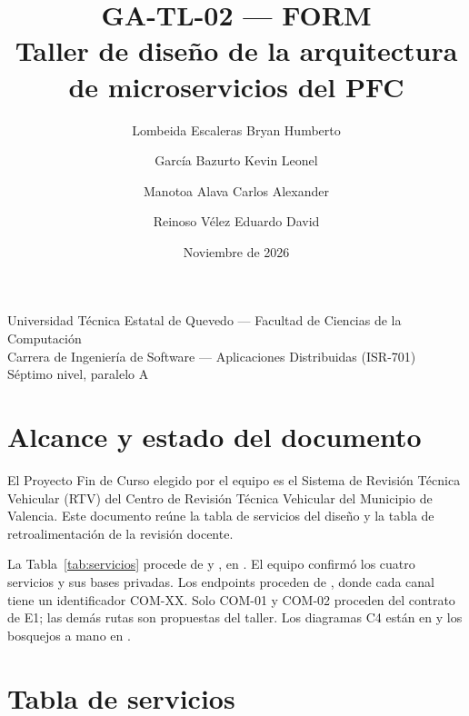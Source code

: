 \documentclass[11pt,a4paper]{article}
\title{GA-TL-02 --- FORM\\Taller de diseño de la arquitectura de microservicios del PFC}
\author{%
  Lombeida Escaleras Bryan Humberto \and
  García Bazurto Kevin Leonel \and
  Manotoa Alava Carlos Alexander \and
  Reinoso Vélez Eduardo David}
\date{Noviembre de 2026}
\begin{document}
\maketitle

\begin{center}
  Universidad Técnica Estatal de Quevedo --- Facultad de Ciencias de la Computación\\
  Carrera de Ingeniería de Software --- Aplicaciones Distribuidas (ISR-701)\\
  Séptimo nivel, paralelo A
\end{center}

\section{Alcance y estado del documento}

El Proyecto Fin de Curso elegido por el equipo es el Sistema de Revisión Técnica Vehicular (RTV) del Centro de Revisión Técnica Vehicular del Municipio de Valencia. Este documento reúne la tabla de servicios del diseño y la tabla de retroalimentación de la revisión docente.

La Tabla~\ref{tab:servicios} procede de  y , en . El equipo confirmó los cuatro servicios y sus bases privadas. Los endpoints proceden de , donde cada canal tiene un identificador COM-XX. Solo COM-01 y COM-02 proceden del contrato de E1; las demás rutas son propuestas del taller. Los diagramas C4 están en  y los bosquejos a mano en .

\section{Tabla de servicios}
\end{document}
